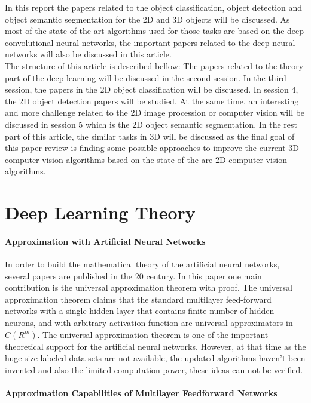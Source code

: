 \documentclass[a4paper,12pt]{article}
\begin{document}
In this report the papers related to the object classification, object detection and object semantic segmentation for the 2D and 3D objects will be discussed. As most of the state of the art algorithms used for those tasks are based on the deep convolutional neural networks, the important papers related to the deep neural networks will also be discussed in this article.\\
The structure of this article is described bellow: The papers related to the theory part of the deep learning will be discussed in the second session. In the third session, the papers in the 2D object classification will be discussed. In session 4, the 2D object detection papers will be studied. At the same time, an interesting and more challenge related to the 2D image procession or computer vision will be discussed in session 5 which is the 2D object semantic segmentation. In the rest part of this article, the similar tasks in 3D will be discussed as the final goal of this paper review is finding some possible approaches to improve the current 3D computer vision algorithms based on the state of the are 2D computer vision algorithms.\\

\part{Deep Learning Theory}
\subsection{Approximation with Artificial Neural Networks \cite{csaji2001}}
In order to build the mathematical theory of the artificial neural networks, several papers are published in the 20 century. In this paper one main contribution is the universal approximation theorem with proof. The universal approximation theorem claims \cite{csaji2001}  that the standard multilayer feed-forward networks with a single hidden layer that contains finite number of hidden neurons, and with arbitrary activation function are universal approximators in $C(R^m)$.  The universal approximation theorem is one of the important theoretical support for the artificial neural networks. However, at that time as the huge size labeled data sets are not available, the updated algorithms haven't been invented and also the limited computation power, these ideas can not be verified.


\subsection{Approximation Capabilities of Multilayer Feedforward Networks \cite{hornik1991} }
\end{document}
